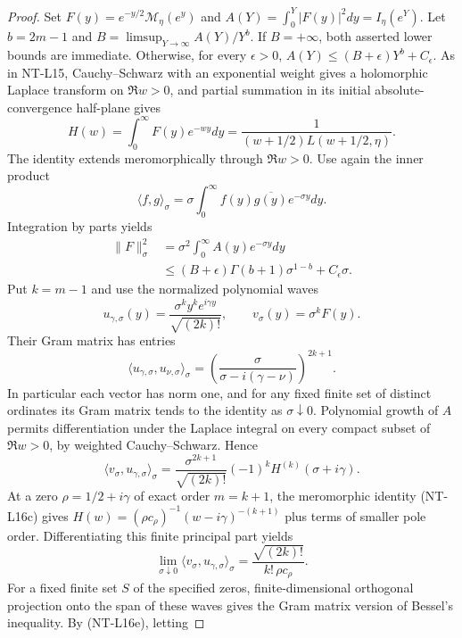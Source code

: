 \begin{proof}
Set $F(y)=e^{-y/2}\mathcal M_\eta(e^y)$ and
$A(Y)=\int_0^Y|F(y)|^2dy=I_\eta(e^Y)$.
Let $b=2m-1$ and
$B=\limsup_{Y\to\infty}A(Y)/Y^b$.
If $B=+\infty$, both asserted lower bounds are immediate.
Otherwise, for every $\epsilon>0$,
$A(Y)\le(B+\epsilon)Y^b+C_\epsilon$.
As in NT-L15, Cauchy--Schwarz with an exponential weight gives a
holomorphic Laplace transform on $\Re w>0$, and partial summation
in its initial absolute-convergence half-plane gives
\[
 H(w)=\int_0^\infty F(y)e^{-wy}dy
      =\frac1{(w+1/2)L(w+1/2,\eta)}.
                                                        \tag{NT-L16c}
\]
The identity extends meromorphically through $\Re w>0$.
Use again the inner product
\[
 \langle f,g\rangle_\sigma=\sigma\int_0^\infty
       f(y)\overline{g(y)}e^{-\sigma y}dy.
\]
Integration by parts yields
\[
 \begin{split}
 \|F\|_\sigma^2
 &=\sigma^2\int_0^\infty A(y)e^{-\sigma y}dy\\
 &\le (B+\epsilon)\Gamma(b+1)\sigma^{1-b}
                               +C_\epsilon\sigma.
 \end{split}                                           \tag{NT-L16d}
\]
Put $k=m-1$ and use the normalized polynomial waves
\[
 u_{\gamma,\sigma}(y)=
       \frac{\sigma^k y^k e^{i\gamma y}}{\sqrt{(2k)!}},
 \qquad v_\sigma(y)=\sigma^k F(y).
\]
Their Gram matrix has entries
\[
 \langle u_{\gamma,\sigma},u_{\nu,\sigma}\rangle_\sigma
       =\left(\frac{\sigma}{\sigma-i(\gamma-\nu)}\right)^{2k+1}.
                                                        \tag{NT-L16e}
\]
In particular each vector has norm one, and for any fixed finite set
of distinct ordinates its Gram matrix tends to the identity as
$\sigma\downarrow0$. Polynomial growth of $A$ permits differentiation
under the Laplace integral on every compact subset of $\Re w>0$,
by weighted Cauchy--Schwarz. Hence
\[
 \langle v_\sigma,u_{\gamma,\sigma}\rangle_\sigma
 =\frac{\sigma^{2k+1}}{\sqrt{(2k)!}}
                 (-1)^k H^{(k)}(\sigma+i\gamma).
\]
At a zero $\rho=1/2+i\gamma$ of exact order $m=k+1$,
the meromorphic identity (NT-L16c) gives
$H(w)=(\rho c_\rho)^{-1}(w-i\gamma)^{-(k+1)}$
plus terms of smaller pole order. Differentiating this finite
principal part yields
\[
 \lim_{\sigma\downarrow0}
 \langle v_\sigma,u_{\gamma,\sigma}\rangle_\sigma
       =\frac{\sqrt{(2k)!}}{k!\,\rho c_\rho}.           \tag{NT-L16f}
\]
For a fixed finite set $S$ of the specified zeros, finite-dimensional
orthogonal projection onto the span of these waves gives the Gram
matrix version of Bessel's inequality. By (NT-L16e), letting

\end{proof}
